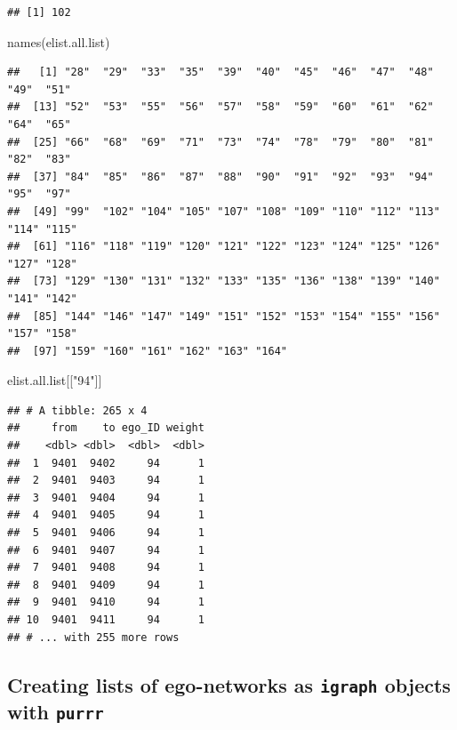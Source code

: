 \documentclass[
]{book}
\newenvironment{Shaded}{\begin{snugshade}}{\end{snugshade}}
\newcommand{\FunctionTok}[1]{\textcolor[rgb]{0.00,0.00,0.00}{#1}}
\newcommand{\NormalTok}[1]{#1}
\newcommand{\StringTok}[1]{\textcolor[rgb]{0.31,0.60,0.02}{#1}}
\begin{document}
\begin{verbatim}
## [1] 102
\end{verbatim}

\begin{Shaded}
\begin{Highlighting}[]
\FunctionTok{names}\NormalTok{(elist.all.list)}
\end{Highlighting}
\end{Shaded}

\begin{verbatim}
##   [1] "28"  "29"  "33"  "35"  "39"  "40"  "45"  "46"  "47"  "48"  "49"  "51" 
##  [13] "52"  "53"  "55"  "56"  "57"  "58"  "59"  "60"  "61"  "62"  "64"  "65" 
##  [25] "66"  "68"  "69"  "71"  "73"  "74"  "78"  "79"  "80"  "81"  "82"  "83" 
##  [37] "84"  "85"  "86"  "87"  "88"  "90"  "91"  "92"  "93"  "94"  "95"  "97" 
##  [49] "99"  "102" "104" "105" "107" "108" "109" "110" "112" "113" "114" "115"
##  [61] "116" "118" "119" "120" "121" "122" "123" "124" "125" "126" "127" "128"
##  [73] "129" "130" "131" "132" "133" "135" "136" "138" "139" "140" "141" "142"
##  [85] "144" "146" "147" "149" "151" "152" "153" "154" "155" "156" "157" "158"
##  [97] "159" "160" "161" "162" "163" "164"
\end{verbatim}

\begin{Shaded}
\begin{Highlighting}[]
\NormalTok{elist.all.list[[}\StringTok{"94"}\NormalTok{]]}
\end{Highlighting}
\end{Shaded}

\begin{verbatim}
## # A tibble: 265 x 4
##     from    to ego_ID weight
##    <dbl> <dbl>  <dbl>  <dbl>
##  1  9401  9402     94      1
##  2  9401  9403     94      1
##  3  9401  9404     94      1
##  4  9401  9405     94      1
##  5  9401  9406     94      1
##  6  9401  9407     94      1
##  7  9401  9408     94      1
##  8  9401  9409     94      1
##  9  9401  9410     94      1
## 10  9401  9411     94      1
## # ... with 255 more rows
\end{verbatim}

\hypertarget{creating-lists-of-ego-networks-as-igraph-objects-with-purrr}{%
\subsection{\texorpdfstring{Creating lists of ego-networks as \texttt{igraph} objects with \texttt{purrr}}{Creating lists of ego-networks as igraph objects with purrr}}\label{creating-lists-of-ego-networks-as-igraph-objects-with-purrr}}
\end{document}
